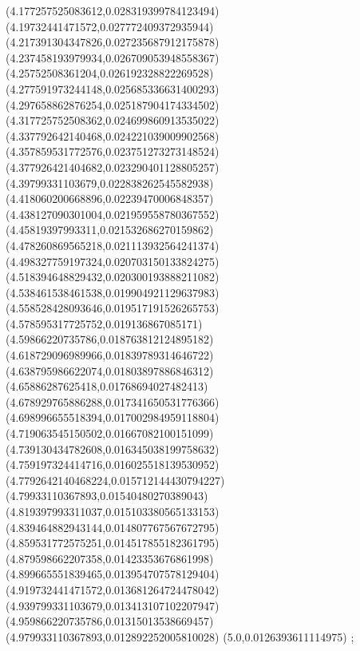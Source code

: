{(4.177257525083612,0.028319399784123494)
(4.19732441471572,0.027772409372935944)
(4.217391304347826,0.027235687912175878)
(4.237458193979934,0.026709053948558367)
(4.25752508361204,0.026192328822269528)
(4.277591973244148,0.025685336631400293)
(4.297658862876254,0.025187904174334502)
(4.317725752508362,0.024699860913535022)
(4.337792642140468,0.024221039009902568)
(4.357859531772576,0.023751273273148524)
(4.377926421404682,0.023290401128805257)
(4.39799331103679,0.022838262545582938)
(4.418060200668896,0.02239470006848357)
(4.438127090301004,0.021959558780367552)
(4.45819397993311,0.021532686270159862)
(4.478260869565218,0.021113932564241374)
(4.498327759197324,0.020703150133824275)
(4.518394648829432,0.020300193888211082)
(4.538461538461538,0.019904921129637983)
(4.558528428093646,0.019517191526265753)
(4.578595317725752,0.019136867085171)
(4.59866220735786,0.018763812124895182)
(4.618729096989966,0.01839789314646722)
(4.638795986622074,0.01803897886846312)
(4.65886287625418,0.01768694027482413)
(4.678929765886288,0.017341650531776366)
(4.698996655518394,0.017002984959118804)
(4.719063545150502,0.01667082100151099)
(4.739130434782608,0.016345038199758632)
(4.759197324414716,0.016025518139530952)
(4.7792642140468224,0.015712144430794227)
(4.79933110367893,0.01540480270389043)
(4.819397993311037,0.015103380565133153)
(4.839464882943144,0.014807767567672795)
(4.859531772575251,0.014517855182361795)
(4.879598662207358,0.01423353676861998)
(4.899665551839465,0.013954707578129404)
(4.919732441471572,0.013681264724478042)
(4.939799331103679,0.013413107102207947)
(4.959866220735786,0.01315013538669457)
(4.979933110367893,0.012892252005810028)
(5.0,0.0126393611114975)
};
